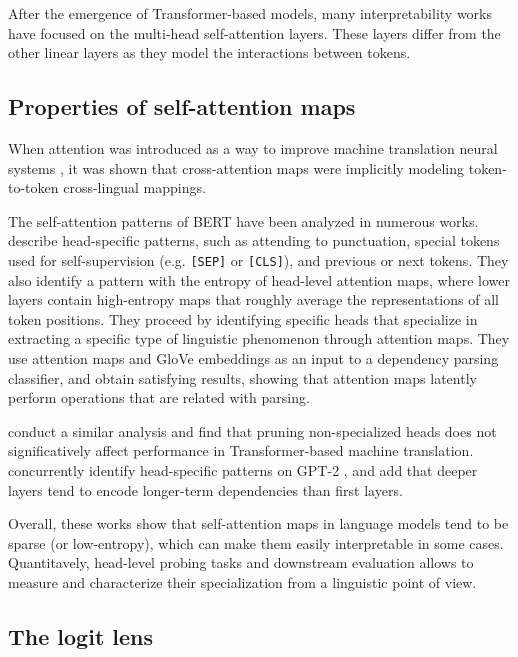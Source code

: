 After the emergence of Transformer-based models, many interpretability works have focused on the multi-head self-attention layers. These layers differ from the other linear layers as they model the interactions between tokens.

\subsection{Properties of self-attention maps}

When attention was introduced as a way to improve machine translation neural systems \citep{bahdanau_nmt}, it was shown that cross-attention maps were implicitly modeling token-to-token cross-lingual mappings. 

The self-attention patterns of BERT have been analyzed in numerous works. \citet{clark-etal-2019-bert} describe head-specific patterns, such as attending to punctuation, special tokens used for self-supervision (e.g. \texttt{[SEP]} or \texttt{[CLS]}), and previous or next tokens. They also identify a pattern with the entropy of head-level attention maps, where lower layers contain high-entropy maps that roughly average the representations of all token positions. They proceed by identifying specific heads that specialize in extracting a specific type of linguistic phenomenon through attention maps. They use attention maps and GloVe embeddings as an input to a dependency parsing classifier, and obtain satisfying results, showing that attention maps latently perform operations that are related with parsing.

\citet{voita-etal-2019-analyzing} conduct a similar analysis and find that pruning non-specialized heads does not significatively affect performance in Transformer-based machine translation. \citet{vig-belinkov-2019-analyzing} concurrently identify head-specific patterns on GPT-2 \citep{gpt2}, and add that deeper layers tend to encode longer-term dependencies than first layers.

Overall, these works show that self-attention maps in language models tend to be sparse (or low-entropy), which can make them easily interpretable in some cases. Quantitavely, head-level probing tasks and downstream evaluation allows to measure and characterize their specialization from a linguistic point of view.

\subsection{The logit lens}

